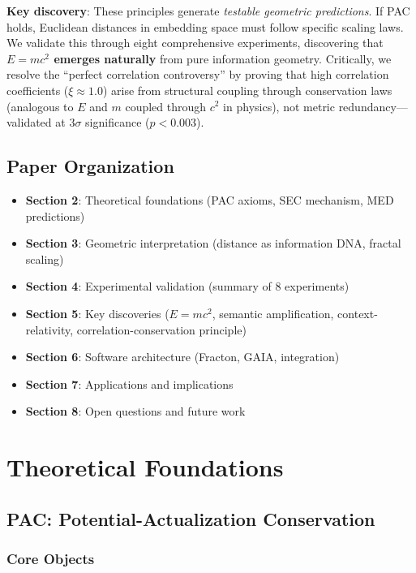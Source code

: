 \documentclass[11pt,a4paper]{article}
\begin{document}
\textbf{Key discovery}: These principles generate \emph{testable geometric predictions}. If PAC holds, Euclidean distances in embedding space must follow specific scaling laws. We validate this through eight comprehensive experiments, discovering that \textbf{$E=mc^2$ emerges naturally} from pure information geometry. Critically, we resolve the ``perfect correlation controversy'' by proving that high correlation coefficients ($\xi \approx 1.0$) arise from structural coupling through conservation laws (analogous to $E$ and $m$ coupled through $c^2$ in physics), not metric redundancy---validated at $3\sigma$ significance ($p<0.003$).

\subsection{Paper Organization}

\begin{itemize}
    \item \textbf{Section 2}: Theoretical foundations (PAC axioms, SEC mechanism, MED predictions)
    \item \textbf{Section 3}: Geometric interpretation (distance as information DNA, fractal scaling)
    \item \textbf{Section 4}: Experimental validation (summary of 8 experiments)
    \item \textbf{Section 5}: Key discoveries ($E=mc^2$, semantic amplification, context-relativity, correlation-conservation principle)
    \item \textbf{Section 6}: Software architecture (Fracton, GAIA, integration)
    \item \textbf{Section 7}: Applications and implications
    \item \textbf{Section 8}: Open questions and future work
\end{itemize}

\section{Theoretical Foundations}

\subsection{PAC: Potential-Actualization Conservation}

\subsubsection{Core Objects}
\end{document}
